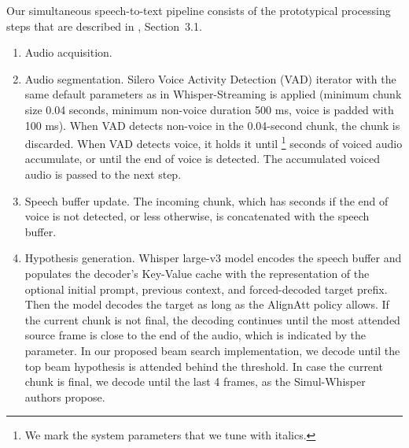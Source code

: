 \documentclass[11pt]{article}
\def\XXX#1{} %
\begin{document}
Our simultaneous speech-to-text pipeline consists of the prototypical processing steps that are described in \citet{papi-etal-2024-how-real}, Section~3.1.

\begin{enumerate}
    \item Audio acquisition. %
    \item Audio segmentation. Silero Voice Activity Detection (VAD) iterator with the same default parameters as in Whisper-Streaming is applied (minimum chunk size 0.04 seconds, minimum non-voice duration 500 ms, voice is padded with 100 ms). When VAD detects non-voice in the 0.04-second chunk, the chunk is discarded. When VAD detects voice, it holds it until \MinChunkSize{}\footnote{We mark the system parameters that we tune with italics.} seconds of voiced audio accumulate, or until the end of voice is detected. The accumulated voiced audio is passed to the next step.
    
    \item Speech buffer update. The incoming chunk, which has \MinChunkSize{} seconds if the end of voice is not detected, or less otherwise, is concatenated with the speech buffer.
    \item Hypothesis generation. Whisper large-v3 model encodes the speech buffer and populates the decoder's Key-Value cache with the representation of the optional initial prompt, previous context, and forced-decoded target prefix. Then the model decodes the target as long as the AlignAtt policy allows. 
    If the current chunk is not final, the decoding continues until the most attended source frame is close to the end of the audio, which is indicated by the \Frames{} parameter. In our proposed beam search implementation, we decode until the top beam hypothesis is attended behind the threshold. In case the current chunk is final, we decode until the last 4 frames, as the Simul-Whisper authors propose. 
    
    

\end{enumerate}
\end{document}
